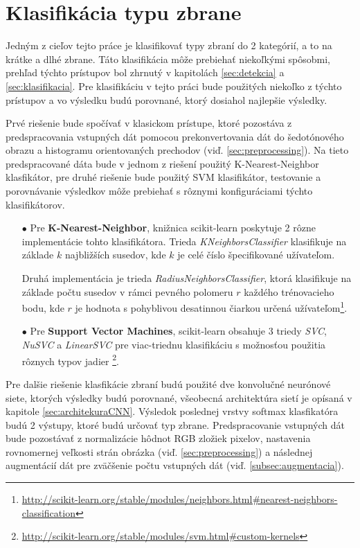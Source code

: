 
\section{Klasifikácia typu zbrane}
\label{sec:klasfikaciatypuzbrane}
Jedným z cieľov tejto práce je klasifikovať typy zbraní do 2 kategórií, a to na krátke a dlhé zbrane.
Táto klasifikácia môže prebiehať niekoľkými spôsobmi, prehľad týchto prístupov bol zhrnutý v kapitolách \ref{sec:detekcia} a \ref{sec:klasifikacia}.
Pre klasifikáciu v tejto práci bude použitých niekoľko z týchto prístupov a vo výsledku budú porovnané, ktorý dosiahol najlepšie výsledky.

Prvé riešenie bude spočívať v klasickom prístupe, ktoré pozostáva z predspracovania vstupných dát pomocou prekonvertovania dát do šedotónového obrazu a histogramu orientovaných prechodov (viď. \ref{sec:preprocessing}).
Na tieto predspracované dáta bude v jednom z riešení použitý K-Nearest-Neighbor klasfikátor, pre druhé riešenie bude použitý SVM klasifikátor, testovanie
    a porovnávanie výsledkov môže prebiehať s rôznymi konfiguráciami týchto klasifikátorov.
\begin{enumerate}
    \item[$\bullet$] Pre \textbf{K-Nearest-Neighbor}, knižnica scikit-learn poskytuje 2 rôzne implementácie tohto klasifikátora.
    Trieda \textit{KNeighborsClassifier} klasifikuje na základe $k$ najbližších susedov, kde $k$ je celé číslo špecifikované užívateľom.
    
    Druhá implementácia je trieda \textit{RadiusNeighborsClassifier}, ktorá klasifikuje na základe počtu susedov v rámci pevného polomeru $r$ každého trénovacieho bodu,
        kde $r$ je hodnota s pohyblivou desatinnou čiarkou určená užívateľom\footnote{\url{http://scikit-learn.org/stable/modules/neighbors.html\#nearest-neighbors-classification}}.
    \item[$\bullet$] Pre \textbf{Support Vector Machines}, scikit-learn obsahuje 3 triedy \textit{SVC}, \textit{NuSVC} a \textit{LinearSVC} pre viac-triednu
        klasifikáciu s možnosťou použitia rôznych typov jadier \footnote{\url{http://scikit-learn.org/stable/modules/svm.html\#custom-kernels}}.
\end{enumerate}

Pre dalšie riešenie klasfikácie zbraní budú použité dve konvolučné neurónové siete, ktorých výsledky budú porovnané, všeobecná architektúra sietí je opísaná v kapitole \ref{sec:architekuraCNN}.
Výsledok poslednej vrstvy softmax klasfikatóra budú 2 výstupy, ktoré budú určovať typ zbrane.
Predspracovanie vstupných dát bude pozostávať z normalizácie hôdnot RGB zložiek pixelov, nastavenia rovnomernej veľkosti strán obrázka (viď. \ref{sec:preprocessing})
    a následnej augmentácií dát pre zväčšenie počtu vstupných dát (viď. \ref{subsec:augmentacia}).
